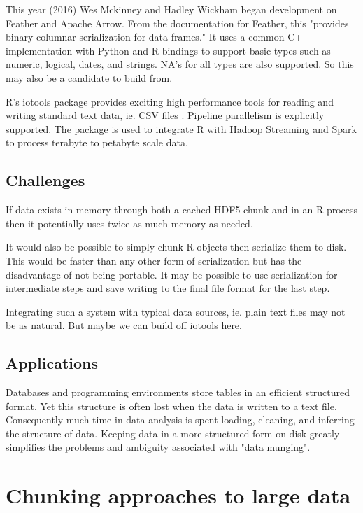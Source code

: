 \documentclass[12pt]{article}
\begin{document}
This year (2016) Wes Mckinney and Hadley Wickham began development on Feather and
Apache Arrow. From the documentation for Feather, this "provides binary columnar
serialization for data frames." It uses a common C++ implementation with
Python and R bindings to support basic types such as numeric, logical,
dates, and strings. NA's for all types are also supported. So this may also
be a candidate to build from.

R's iotools package provides exciting high performance tools for reading
and writing standard text data, ie. CSV files \cite{arnold2015iotools}.
Pipeline parallelism is explicitly supported. The package is used to
integrate R with Hadoop Streaming and Spark to process terabyte to petabyte
scale data.

\subsection{Challenges}

If data exists in memory through both a cached HDF5 chunk and in an R process
then it potentially uses twice as much memory as needed.

It would also be possible to simply chunk R objects then serialize 
them to disk. This would be faster than any other form of serialization but
has the disadvantage of not being portable. It may be possible to use 
serialization for intermediate steps and save writing to the final file
format for the last step.

Integrating such a system with typical data sources, ie. plain text files may
not be as natural. But maybe we can build off iotools here.

\subsection{Applications}

Databases and programming environments store tables in an efficient
structured format. Yet this structure is often lost when the data is
written to a text file. Consequently much time in data analysis is
spent loading, cleaning, and inferring the structure of data. Keeping data
in a more structured form on disk greatly simplifies the problems and
ambiguity associated with "data munging".


\section{Chunking approaches to large data}
\end{document}
